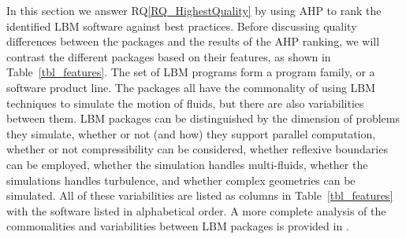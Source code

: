 \documentclass[final, 3p, times, authoryear]{elsarticle}
\newcommand{\rqref}[1]{RQ\ref{#1}}
\begin{document}
In this section we answer \rqref{RQ_HighestQuality} by using AHP to rank the
identified LBM software against best practices.  Before discussing quality
differences between the packages and the results of the AHP ranking, we will
contrast the different packages based on their features, as shown in
Table~\ref{tbl_features}. The set of LBM programs form a program family, or a
software product line.  The packages all have the commonality of using LBM
techniques to simulate the motion of fluids, but there are also variabilities
between them.  LBM packages can be distinguished by the dimension of problems
they simulate, whether or not (and how) they support parallel computation,
whether or not compressibility can be considered, whether reflexive boundaries
can be employed, whether the simulation handles multi-fluids, whether the
simulations handles turbulence, and whether complex geometries can be simulated.
All of these variabilities are listed as columns in Table~\ref{tbl_features}
with the software listed in alphabetical order. A more complete analysis of the
commonalities and variabilities between LBM packages is provided in
\citet{Michalski2021}.
\end{document}
